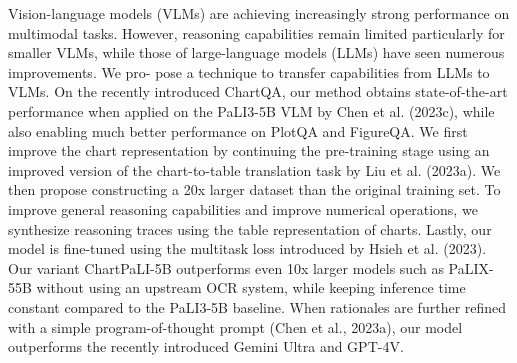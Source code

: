 Vision-language models (VLMs) are achieving increasingly strong performance on multimodal tasks. However, reasoning capabilities remain limited particularly for smaller VLMs, while those of large-language models (LLMs) have seen numerous improvements. We pro- pose a technique to transfer capabilities from LLMs to VLMs. On the recently introduced ChartQA, our method obtains state-of-the-art performance when applied on the PaLI3-5B VLM by Chen et al. (2023c), while also enabling much better performance on PlotQA and FigureQA. We first improve the chart representation by continuing the pre-training stage using an improved version of the chart-to-table translation task by Liu et al. (2023a). We then propose constructing a 20x larger dataset than the original training set. To improve general reasoning capabilities and improve numerical operations, we synthesize reasoning traces using the table representation of charts. Lastly, our model is fine-tuned using the multitask loss introduced by Hsieh et al. (2023). Our variant ChartPaLI-5B outperforms even 10x larger models such as PaLIX-55B without using an upstream OCR system, while keeping inference time constant compared to the PaLI3-5B baseline. When rationales are further refined with a simple program-of-thought prompt (Chen et al., 2023a), our model outperforms the recently introduced Gemini Ultra and GPT-4V.
